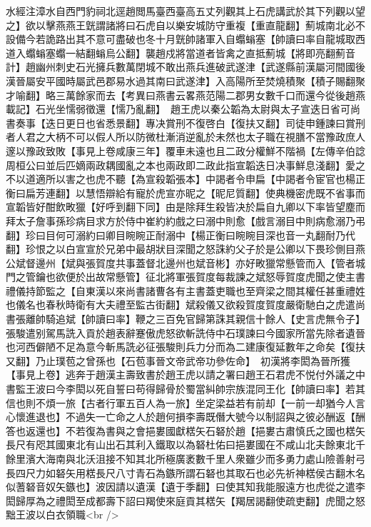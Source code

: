 水經注漳水自西門豹祠北逕趙閲馬臺西臺高五丈列觀其上石虎講武於其下列觀以望之】欲以擊燕燕王皝謂諸將曰石虎自以樂安城防守重複【重直龍翻】薊城南北必不設備今若詭路出其不意可盡破也冬十月皝帥諸軍入自蠮螉塞【帥讀曰率自龍城取西道入蠮螉塞蠮一結翻螉烏公翻】襲趙戍將當道者皆禽之直抵薊城【將即亮翻薊音計】趙幽州刺史石光擁兵數萬閉城不敢出燕兵進破武遂津【武遂縣前漢屬河間國後漢晉屬安平國時屬武邑郡易水過其南曰武遂津】入高陽所至焚燒積聚【積子賜翻聚才喻翻】略三萬餘家而去【考異曰燕書云畧燕范陽二郡男女數千口而還今從後趙燕載記】石光坐懦弱徵還【懦乃亂翻】　趙王虎以秦公韜為太尉與太子宣迭日省可尚書奏事【迭日更日也省悉景翻】專决賞刑不復啓白【復扶又翻】司徒申鍾諫曰賞刑者人君之大柄不可以假人所以防微杜漸消逆亂於未然也太子職在視膳不當豫政庶人邃以豫政致敗【事見上卷咸康三年】覆車未遠也且二政分權鮮不階禍【左傳辛伯諗周桓公曰並后匹嫡兩政耦國亂之本也兩政即二政此指宣韜迭日决事鮮息淺翻】愛之不以道適所以害之也虎不聽【為宣殺韜張本】中謁者令申扁【中謁者令宦官也楊正衡曰扁芳連翻】以慧悟辯給有寵於虎宣亦昵之【昵尼質翻】使典機密虎既不省事而宣韜皆好酣飲畋獵【好呼到翻下同】由是除拜生殺皆决於扁自九卿以下率皆望塵而拜太子詹事孫珍病目求方於侍中崔約約戲之曰溺中則愈【戲言溺目中則病愈溺乃弔翻】珍曰目何可溺約曰卿目睕睕正耐溺中【楊正衡曰睕睕目深也音一丸翻耐乃代翻】珍恨之以白宣宣於兄弟中最胡狀目深聞之怒誅約父子於是公卿以下畏珍側目燕公斌督邊州【斌與張賀度共事蓋督北邊州也斌音彬】亦好畋獵常懸管而入【管者城門之管鑰也欲便於出故常懸管】征北將軍張賀度每裁諫之斌怒辱賀度虎聞之使主書禮儀持節監之【自東漢以來尚書諸曹各有主書蓋吏職也至齊梁之間其權任甚重禮姓也儀名也春秋時衛有大夫禮至監古街翻】斌殺儀又欲殺賀度賀度嚴衛馳白之虎遣尚書張離帥騎追斌【帥讀曰率】鞭之三百免官歸第誅其親信十餘人【史言虎無令子】　張駿遣别駕馬詵入貢於趙表辭蹇傲虎怒欲斬詵侍中石璞諫曰今國家所當先除者遺晉也河西僻陋不足為意今斬馬詵必征張駿則兵力分而為二建康復延數年之命矣【復扶又翻】乃止璞苞之曾孫也【石苞事晉文帝武帝功參佐命】　初漢將李閎為晉所獲【事見上卷】逃奔于趙漢主壽致書於趙王虎以請之署曰趙王石君虎不悦付外議之中書監王波曰今李閎以死自誓曰苟得歸骨於蜀當糾帥宗族混同王化【帥讀曰率】若其信也則不煩一旅【古者行軍五百人為一旅】坐定梁益若有前却【一前一却猶今人言心懷進退也】不過失一亡命之人於趙何損李壽既僭大號今以制詔與之彼必酬返【酬答也返還也】不若復為書與之會挹婁國獻楛矢石砮於趙【挹婁古肅慎氏之國也楛矢長尺有咫其國東北有山出石其利入鐵取以為砮杜佑曰挹婁國在不咸山北夫餘東北千餘里濱大海南與北沃沮接不知其北所極廣袤數千里人衆雖少而多勇力處山險善射弓長四尺力如砮矢用楛長尺八寸青石為鏃所謂石砮也其取石也必先祈神楛侯古翻木名似蓍砮音奴矢鏃也】波因請以遺漢【遺于季翻】曰使其知我能服遠方也虎從之遣李閎歸厚為之禮閎至成都壽下詔曰羯使來庭貢其楛矢【羯居謁翻使疏吏翻】虎聞之怒黜王波以白衣領職<br />
